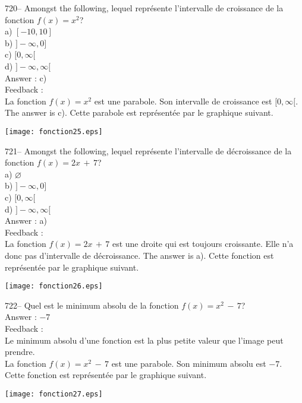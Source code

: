 \documentclass[letterpaper, 12pt]{article}
\begin{document}
720-- Amongst the following, lequel repr\'esente l'intervalle de
croissance de la fonction $f(x)=x^{2}$?\\
a) $[-10,10]$\\
b) $]-\infty,0]$\\
c) $[0,\infty[$\\
d) $]-\infty,\infty[$\\

Answer : c)\\

Feedback : \\
La fonction $f(x)=x^{2}$ est une parabole.  Son intervalle de croissance est
$[0,\infty[$.  The answer is c).  Cette parabole est repr\'esent\'ee par
le graphique suivant.\\
    \begin{center}
    \texttt{[image: fonction25.eps]}
    \end{center}


721-- Amongst the following, lequel repr\'esente l'intervalle de
d\'ecroissance de la fonction $f(x)=2x\,+\,7$?\\
a) $\varnothing$\\
b) $]-\infty,0]$\\
c) $[0,\infty[$\\
d) $]-\infty,\infty[$\\

Answer : a)\\

Feedback : \\
La fonction $f(x)=2x\,+\,7$ est une droite qui est toujours croissante.
Elle n'a donc pas d'intervalle de d\'ecroissance.  The answer is a).
Cette fonction est repr\'esent\'ee par le graphique suivant.\\
    \begin{center}
    \texttt{[image: fonction26.eps]}
    \end{center}


722-- Quel est le minimum absolu de la fonction $f(x)=x^{2}\,-\,7$?\\

Answer : $-7$\\

Feedback : \\
Le minimum absolu d'une fonction est la plus petite valeur que l'image peut
prendre.\\
La fonction $f(x)=x^{2}\,-\,7$ est une parabole.  Son minimum absolu est
$-7$.  Cette fonction est repr\'esent\'ee par le graphique suivant.\\
    \begin{center}
    \texttt{[image: fonction27.eps]}
    \end{center}
\end{document}
